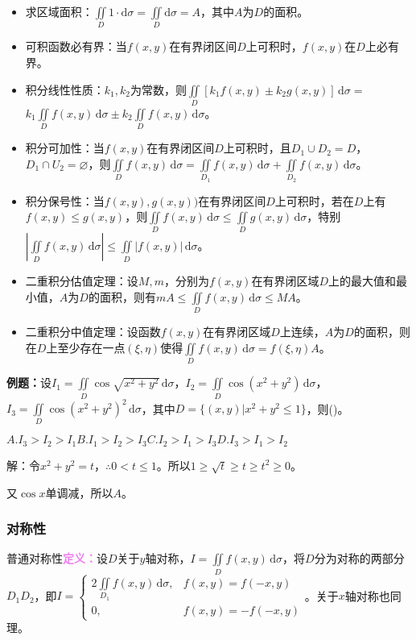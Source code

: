 \begin{itemize}
    \item 求区域面积：$\iint\limits_D1\cdot\textrm{d}\sigma=\iint\limits_D\textrm{d}\sigma=A$，其中$A$为$D$的面积。
    \item 可积函数必有界：当$f(x,y)$在有界闭区间$D$上可积时，$f(x,y)$在$D$上必有界。
    \item 积分线性性质：$k_1,k_2$为常数，则$\iint\limits_D[k_1f(x,y)\pm k_2g(x,y)]\,\textrm{d}\sigma=$\\$k_1\iint\limits_Df(x,y)\,\textrm{d}\sigma\pm k_2\iint\limits_Df(x,y)\,\textrm{d}\sigma$。
    \item 积分可加性：当$f(x,y)$在有界闭区间$D$上可积时，且$D_1\cup D_2=D$，$D_1\cap U_2=\varnothing$，则$\iint\limits_Df(x,y)\,\textrm{d}\sigma=\iint\limits_{D_1}f(x,y)\,\textrm{d}\sigma+\iint\limits_{D_2}f(x,y)\,\textrm{d}\sigma$。
    \item 积分保号性：当$f(x,y),g(x,y))$在有界闭区间$D$上可积时，若在$D$上有$f(x,y)\leqslant g(x,y)$，则$\iint\limits_Df(x,y)\,\textrm{d}\sigma\leqslant\iint\limits_Dg(x,y)\,\textrm{d}\sigma$，特别$\left\vert\iint\limits_Df(x,y)\,\textrm{d}\sigma\right\vert\leqslant\iint\limits_D\vert f(x,y)\vert\,\textrm{d}\sigma$。
    \item 二重积分估值定理：设$M,m$，分别为$f(x,y)$在有界闭区域$D$上的最大值和最小值，$A$为$D$的面积，则有$mA\leqslant\iint\limits_Df(x,y)\,\textrm{d}\sigma\leqslant MA$。
    \item 二重积分中值定理：设函数$f(x,y)$在有界闭区域$D$上连续，$A$为$D$的面积，则在$D$上至少存在一点$(\xi,\eta)$使得$\iint\limits_Df(x,y)\,\textrm{d}\sigma=f(\xi,\eta)A$。
\end{itemize}

\textbf{例题：}设$I_1=\iint\limits_D\cos\sqrt{x^2+y^2}\,\textrm{d}\sigma$，$I_2=\iint\limits_D\cos(x^2+y^2)\,\textrm{d}\sigma$，$I_3=\iint\limits_D\cos(x^2+y^2)^2\,\textrm{d}\sigma$，其中$D=\{(x,y)|x^2+y^2\leqslant1\}$，则()。

$A.I_3>I_2>I_1$\qquad$B.I_1>I_2>I_3$\qquad$C.I_2>I_1>I_3$\qquad$D.I_3>I_1>I_2$

解：令$x^2+y^2=t$，$\therefore0<t\leqslant1$。所以$1\geqslant\sqrt{t}\geqslant t\geqslant t^2\geqslant0$。

又$\cos x$单调减，所以$A$。

\subsubsection{对称性}

普通对称性\textcolor{violet}{\textbf{定义：}}设$D$关于$y$轴对称，$I=\iint\limits_Df(x,y)\,\textrm{d}\sigma$，将$D$分为对称的两部分$D_1D_2$，即$I=\left\{\begin{array}{ll}
    2\iint\limits_{D_1}f(x,y)\,\textrm{d}\sigma, & f(x,y)=f(-x,y) \\
    0, & f(x,y)=-f(-x,y)
\end{array}\right.$。关于$x$轴对称也同理。

